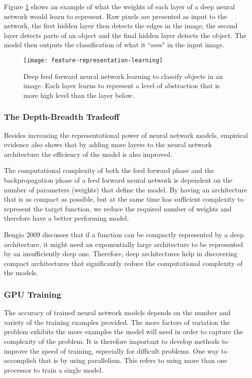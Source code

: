 Figure \ref{fig:feature-representation-learning} shows an example of what the weights of each layer of a deep neural network would learn to represent. Raw pixels are presented as input to the network, the first hidden layer then detects the edges in the image, the second layer detects parts of an object and the final hidden layer detects the object. The model then outputs the classification of what it ``sees" in the input image.

\begin{figure}[t]
	\centering
	\texttt{[image: feature-representation-learning]}
	\caption{Deep feed forward neural network learning to classify objects in an image. Each layer learns to represent a level of abstraction that is more high level than the layer below.}
	\label{fig:feature-representation-learning}
\end{figure}

\subsubsection{The Depth-Breadth Tradeoff}

Besides increasing the representational power of neural network models, empirical evidence also shows that by adding more layers to the neural network architecture the efficiency of the model is also improved. 

The computational complexity of both the feed forward phase and the backpropagation phase of a feed forward neural network is dependent on the number of parameters (weights) that define the model. By having an architecture that is as compact as possible, but at the same time has sufficient complexity to represent the target function, we reduce the required number of weights and therefore have a better performing model.

Bengio 2009 discusses that if a function can be compactly represented by a deep architecture, it might need an exponentially large architecture to be represented by an insufficiently deep one\cite{Bengio:2009:LDA:1658423.1658424}. Therefore, deep architectures help in discovering compact architectures that significantly reduce the computational complexity of the models.

\subsubsection{GPU Training}

The accuracy of trained neural network models depends on the number and variety of the training examples provided. The more factors of variation the problem exhibits the more examples the model will need in order to capture the complexity of the problem. It is therefore important to develop methods to improve the speed of training, especially for difficult problems. One way to accomplish that is by using parallelism. This refers to using more than one processor to train a single model.


